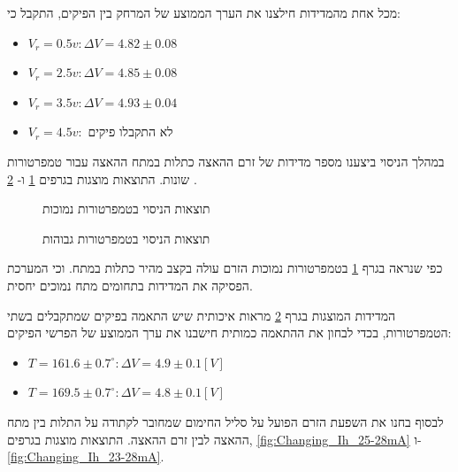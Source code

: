 \documentclass{article}
\begin{document}
מכל אחת מהמדידות חילצנו את הערך הממוצע של המרחק בין הפיקים, התקבל כי:
\begin{itemize}
    \item $V_r=0.5v: \Delta V =4.82 \pm 0.08$
    \item $V_r=2.5v: \Delta V =4.85 \pm 0.08$
    \item $V_r=3.5v: \Delta V =4.93 \pm 0.04$
    \item $V_r=4.5v:$ לא התקבלו פיקים
\end{itemize}


במהלך הניסוי ביצענו מספר מדידות של זרם ההאצה כתלות במתח ההאצה עבור טמפרטורות שונות.
התוצאות מוצגות בגרפים
\ref{graph:Changing_temp_0-10v}
ו-
\ref{graph:Changing_temp_0-30v}
.

\begin{graph}[H]
    \begin{subfigure}[b]{\textwidth}
    	\centering
    	\resizebox{0.95\textwidth}{!}{}
    	\caption{תוצאות הניסוי בטמפרטורות נמוכות}
    	\label{graph:Changing_temp_0-10v}
    \end{subfigure}
    \hfill
    \begin{subfigure}[b]{\textwidth}
    	\centering
    	\resizebox{0.95\textwidth}{!}{}
    	\caption{תוצאות הניסוי בטמפרטורות גבוהות}
    	\label{graph:Changing_temp_0-30v}
    \end{subfigure}
    \label{graph:Changing_temp}
\end{graph}

כפי שנראה בגרף 
\ref{graph:Changing_temp_0-10v}
בטמפרטורות נמוכות הזרם עולה בקצב מהיר כתלות במתח. 
וכי המערכת הפסיקה את המדידות בתחומים מתח נמוכים יחסית.

המדידות המוצגות בגרף
\ref{graph:Changing_temp_0-30v}
מראות איכותית שיש התאמה בפיקים שמתקבלים בשתי הטמפרטורות, בכדי לבחון את ההתאמה כמותית חישבנו את ערך הממוצע של הפרשי הפיקים:
\begin{itemize}
    \item $T = 161.6 \pm 0.7 ^{\circ}:\Delta V = 4.9 \pm 0.1  [V]$ 
    \item $T = 169.5 \pm 0.7 ^{\circ}:\Delta V = 4.8 \pm 0.1  [V]$ 
\end{itemize}

לבסוף בחנו את השפעת הזרם הפועל על סליל החימום שמחובר לקתודה על התלות בין מתח ההאצה לבין זרם ההאצה.
התוצאות מוצגות בגרפים,
\ref{fig:Changing_Ih_25-28mA}
ו-
\ref{fig:Changing_Ih_23-28mA}.
\end{document}
